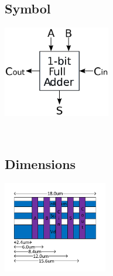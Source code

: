 





\begin{figure}[ht!]
        \centering
        \begin{subfigure}[b]{0.5\textwidth}
			\subsection*{Symbol}
                \includegraphics[width=\textwidth,height=4cm,keepaspectratio]{../fulladder/symbol.png}
        \end{subfigure}%
        ~ %
        \begin{subfigure}[b]{0.5\textwidth}
				\subsection*{Dimensions}
                \includegraphics[width=\textwidth,height=4cm,keepaspectratio]{../fulladder/blackbox.pdf}
        \end{subfigure}
		~ %
        \begin{subfigure}[b]{0.7\textwidth}

\end{subfigure}
\end{figure}
